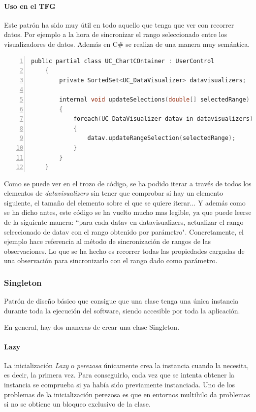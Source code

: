 \paragraph{Uso en el TFG}
Este patr\'on ha sido muy \'util en todo aquello que tenga que ver con recorrer datos. Por ejemplo a la hora de
sincronizar el rango seleccionado entre los visualizadores de datos. Adem\'as en C\# se realiza de una manera 
muy sem\'antica.

\begin{lstlisting}[language=C, numbers=left, showspaces=false, breaklines=true, tabsize=2]
	public partial class UC_ChartCOntainer : UserControl 
	{
		private SortedSet<UC_DataVisualizer> datavisualizers;
		
		internal void updateSelections(double[] selectedRange)
		{
			foreach(UC_DataVisualizer datav in datavisualizers) 
			{
				datav.updateRangeSelection(selectedRange);
			}
		}
	}
\end{lstlisting}

Como se puede ver en el trozo de c\'odigo, se ha podido iterar a trav\'es de todos los elementos
de \emph{datavisualizers} sin tener que comprobar si hay un elemento siguiente, el tama\~no del
elemento sobre el que se quiere iterar... Y adem\'as como se ha dicho antes, este
c\'odigo se ha vuelto mucho mas legible, ya que puede leerse de la 
siguiente manera: ``para cada datav en datavisualizers,
actualizar el rango seleccionado de datav con el rango obtenido por par\'ametro".
Concretamente, el ejemplo hace referencia al m\'etodo de sincronizaci\'on de rangos de las
observaciones. Lo que se ha hecho es recorrer todas las propiedades cargadas de una observaci\'on para
sincronizarlo con el rango dado como par\'ametro.

\subsubsection{Singleton}
Patr\'on de dise\~no b\'asico que consigue que una clase tenga una \'unica instancia durante toda la ejecuci\'on del software, siendo 
accesible por toda la aplicaci\'on.

En general, hay dos maneras de crear una clase Singleton.

\paragraph{Lazy} La inicializaci\'on \emph{Lazy} o \emph{perezosa} \'unicamente crea la instancia cuando la necesita, es decir, la primera vez.
Para conseguirlo, cada vez que se intenta obtener la instancia se comprueba si ya hab\'ia sido previamente instanciada. Uno de los problemas de
la inicializaci\'on perezosa es que en entornos multihilo da problemas si no se obtiene un bloqueo exclusivo de la clase.

